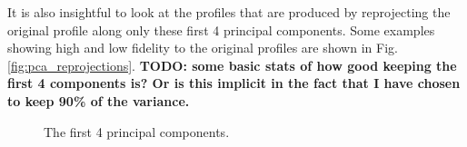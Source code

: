 \documentclass{article}
\newcommand\todo[1]{\textbf{TODO: #1}}
\begin{document}
It is also insightful to look at the profiles that are produced by reprojecting the original profile along only these first 4 principal components. Some examples showing high and low fidelity to the original profiles are shown in Fig. \ref{fig:pca_reprojections}. \todo{some basic stats of how good keeping the first 4 components is? Or is this implicit in the fact that I have chosen to keep 90\% of the variance.}

\begin{figure}[htp!]%
    \centering
    \qquad
    \qquad
    \qquad
    \qquad
    \caption{The first 4 principal components.}%
    \label{fig:pca_components}%
\end{figure}
\end{document}
